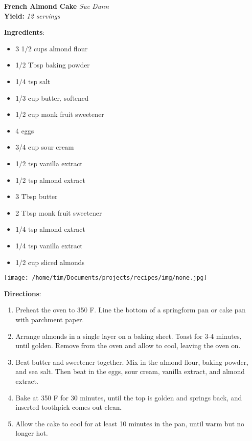 \documentclass[11pt, twoside, openany]{book}
\begin{document}
\noindent\begin{minipage}[t]{\linewidth}%
{\Large\textbf{French Almond Cake}} \label{french-almond-cake}\hfill\textit{Sue Dunn}\\
\textbf{Yield:} \textit{12 servings}\\
\noindent\begin{minipage}[t]{0.78\linewidth}%
\textbf{Ingredients}:\vspace{-3mm}
\begin{multicols}{2}
\begin{itemize}\setlength\itemsep{-1mm}
\item 3 1/2 cups almond flour
\item 1/2 Tbsp baking powder
\item 1/4 tsp salt
\item 1/3 cup butter, softened
\item 1/2 cup monk fruit sweetener
\item 4 eggs
\item 3/4 cup sour cream
\item 1/2 tsp vanilla extract
\item 1/2 tsp almond extract
\item 3 Tbsp butter
\item 2 Tbsp monk fruit sweetener
\item 1/4 tsp almond extract
\item 1/4 tsp vanilla extract
\item 1/2 cup sliced almonds
\end{itemize}
\end{multicols}
\end{minipage}
\noindent\begin{minipage}[t]{0.18\linewidth}
\centering \strut\vspace*{-\baselineskip}\newline
\texttt{[image: /home/tim/Documents/projects/recipes/img/none.jpg]}\\
\end{minipage}\vspace{3mm}
\textbf{Directions}:
\vspace{-3mm}\begin{enumerate}\setlength\itemsep{-1mm}
\item Preheat the oven to 350 F. Line the bottom of a springform pan or cake pan with parchment paper.
\item Arrange almonds in a single layer on a baking sheet. Toast for 3-4 minutes, until golden. Remove from the oven and allow to cool, leaving the oven on.
\item Beat butter and sweetener together. Mix in the almond flour, baking powder, and sea salt. Then beat in the eggs, sour cream, vanilla extract, and almond extract.
\item Bake at 350 F for 30 minutes, until the top is golden and springs back, and inserted toothpick comes out clean.
\item Allow the cake to cool for at least 10 minutes in the pan, until warm but no longer hot.
\end{enumerate}
\end{minipage}\vspace{8mm}
\end{document}
